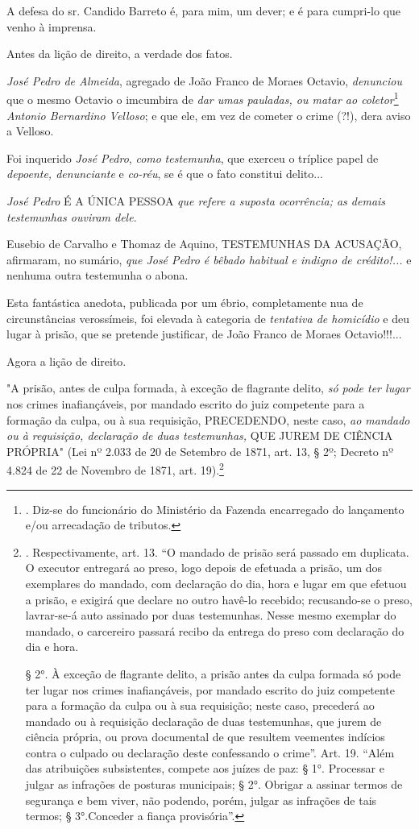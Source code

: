 A defesa do sr. Candido Barreto é, para mim, um dever; e é para
cumpri-lo que venho à imprensa.

Antes da lição de direito, a verdade dos fatos.

\emph{José Pedro de Almeida}, agregado de João Franco de Moraes Octavio,
\emph{denunciou} que o mesmo Octavio o imcumbira de \emph{dar umas
pauladas, ou matar ao coletor}\footnote{. Diz-se do funcionário do
  Ministério da Fazenda encarregado do lançamento e/ou arrecadação de
  tributos.} \emph{Antonio Bernardino Velloso}; e que ele, em vez de
cometer o crime (?!), dera aviso a Velloso.

Foi inquerido \emph{José Pedro}, \emph{como} \emph{testemunha}, que
exerceu o tríplice papel de \emph{depoente, denunciante} e
\emph{co-réu}, se é que o fato constitui delito...

\emph{José Pedro} É A ÚNICA PESSOA \emph{que refere a suposta
ocorrência; as demais testemunhas ouviram dele}.

Eusebio de Carvalho e Thomaz de Aquino, TESTEMUNHAS DA ACUSAÇÃO,
afirmaram, no sumário, \emph{que José Pedro é bêbado habitual e indigno
de crédito!...} e nenhuma outra testemunha o abona.

Esta fantástica anedota, publicada por um ébrio, completamente nua de
circunstâncias verossímeis, foi elevada à categoria de \emph{tentativa
de homicídio} e deu lugar à prisão, que se pretende justificar, de João
Franco de Moraes Octavio!!!...

Agora a lição de direito.

"A prisão, antes de culpa formada, à exceção de flagrante delito,
\emph{só pode ter lugar} nos crimes inafiançáveis, por mandado escrito
do juiz competente para a formação da culpa, ou à sua requisição,
PRECEDENDO, neste caso, \emph{ao mandado ou à requisição, declaração de
duas testemunhas,} QUE JUREM DE CIÊNCIA PRÓPRIA" (Lei nº 2.033 de 20 de
Setembro de 1871, art. 13, § 2º; Decreto nº 4.824 de 22 de Novembro de
1871, art. 19).\footnote{. Respectivamente, art. 13. ``O mandado de
  prisão será passado em duplicata. O executor entregará ao preso, logo
  depois de efetuada a prisão, um dos exemplares do mandado, com
  declaração do dia, hora e lugar em que efetuou a prisão, e exigirá que
  declare no outro havê-lo recebido; recusando-se o preso, lavrar-se-á
  auto assinado por duas testemunhas. Nesse mesmo exemplar do mandado, o
  carcereiro passará recibo da entrega do preso com declaração do dia e
  hora.

  § 2°. À exceção de flagrante delito, a prisão antes da culpa formada
  só pode ter lugar nos crimes inafiançáveis, por mandado escrito do
  juiz competente para a formação da culpa ou à sua requisição; neste
  caso, precederá ao mandado ou à requisição declaração de duas
  testemunhas, que jurem de ciência própria, ou prova documental de que
  resultem veementes indícios contra o culpado ou declaração deste
  confessando o crime''. Art. 19. ``Além das atribuições subsistentes,
  compete aos juízes de paz: § 1°. Processar e julgar as infrações de
  posturas municipais; § 2°. Obrigar a assinar termos de segurança e bem
  viver, não podendo, porém, julgar as infrações de tais termos; §
  3°.Conceder a fiança provisória''.}

